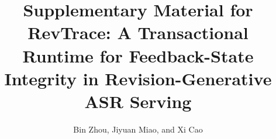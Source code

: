 \documentclass[journal,10pt]{IEEEtran}
\theoremstyle{remark}
\begin{document}
\title{Supplementary Material for RevTrace: A Transactional Runtime for
Feedback-State Integrity in Revision-Generative ASR Serving}
\author{Bin Zhou, Jiyuan Miao, and Xi Cao}
\maketitle


\end{document}
